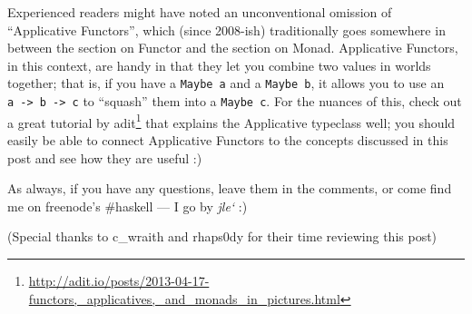 \documentclass[]{article}
\renewcommand{\href}[2]{#2\footnote{\url{#1}}}
\begin{document}
Experienced readers might have noted an unconventional omission of
``Applicative Functors'', which (since 2008-ish) traditionally goes
somewhere in between the section on Functor and the section on Monad.
Applicative Functors, in this context, are handy in that they let you
combine two values in worlds together; that is, if you have a
\texttt{Maybe\ a} and a \texttt{Maybe\ b}, it allows you to use an
\texttt{a\ -\textgreater{}\ b\ -\textgreater{}\ c} to ``squash'' them
into a \texttt{Maybe\ c}. For the nuances of this, check out a great
\href{http://adit.io/posts/2013-04-17-functors,_applicatives,_and_monads_in_pictures.html}{tutorial
by adit} that explains the Applicative typeclass well; you should easily
be able to connect Applicative Functors to the concepts discussed in
this post and see how they are useful :)

As always, if you have any questions, leave them in the comments, or
come find me on freenode's \#haskell --- I go by \emph{jle`} :)

(Special thanks to c\_wraith and rhaps0dy for their time reviewing this
post)
\end{document}
